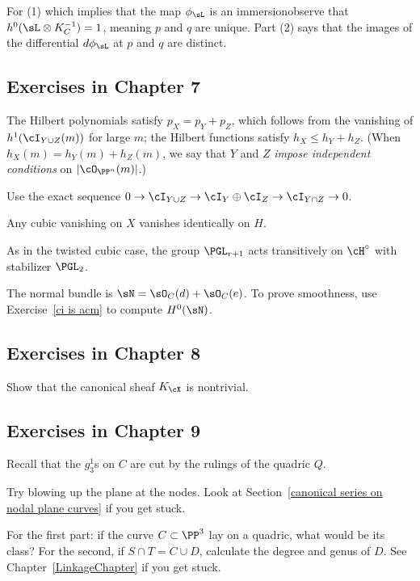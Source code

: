For (1) \emdash which implies that the map $\phi_\sL$ is an
immersion\emdash observe that $h^0(\sL\otimes K_C^{-1}) = 1$, meaning
$p$ and $q$ are unique. Part (2) says that the images of the
differential $d\phi_\sL$ at $p$ and $q$ are distinct.

\subsection*{Exercises in Chapter 7\nopunct}

The Hilbert polynomials satisfy $p_X = p_Y + p_Z$, which follows
from the vanishing of $h^1(\cI_{Y\cup Z} (m))$ for large $m$; the
Hilbert functions satisfy $h_X \leq h_Y + h_Z$. (When $h_X(m) = h_Y(m)
+ h_Z(m)$, we say that $Y$ and $Z$
\emph{impose independent conditions}
%
on $|\cO_{\PP^n}(m)|$.)

Use the exact sequence
$
0 \to \cI_{Y\cup Z} \to \cI_{Y} \oplus \cI_{Z} \to \cI_{Y \cap Z} \to 0
$.

Any cubic vanishing on $X$ vanishes identically on $H$.

As in the twisted cubic case, the group $\PGL_{r+1}$
%
acts transitively on $\cH^\circ$ with stabilizer $\PGL_2$.

The normal bundle is $\sN = \sO_C(d)+\sO_C(e)$. To prove smoothness, use
Exercise~\ref{ci is acm} to compute $H^0(\sN)$.

\subsection*{Exercises in Chapter 8\nopunct}

 Show that the canonical sheaf $K_\cX$ is nontrivial.

\subsection*{Exercises in Chapter 9\nopunct}

Recall that the $g^1_3$s on $C$ are cut by the rulings of the quadric $Q$.

Try blowing up
%
the plane at the nodes. Look at
Section~\ref{canonical series on nodal plane curves} if you get stuck.

For the first part: if the curve $C \subset \PP^3$ lay on a quadric,
what would be its class? For the second, if
$S \cap T = C \cup D$, calculate the degree and genus of $D$.
See Chapter~\ref{LinkageChapter} if you get stuck.


